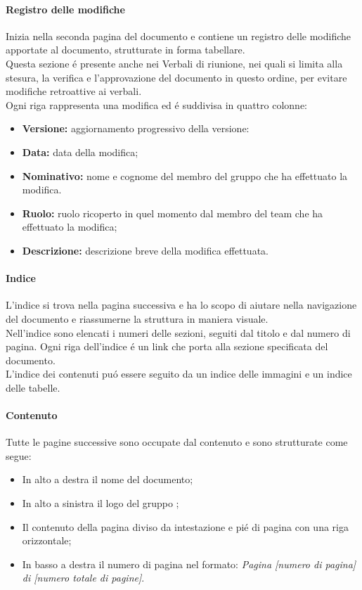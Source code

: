      \paragraph{Registro delle modifiche\\}
      Inizia nella seconda pagina del documento e contiene un registro delle modifiche apportate al documento, strutturate in forma tabellare.\\
      Questa sezione é presente anche nei Verbali di riunione, nei quali si limita alla stesura, la verifica e l'approvazione del documento in questo ordine, per evitare modifiche retroattive ai verbali.\\
      Ogni riga rappresenta una modifica ed é suddivisa in quattro colonne:
      \begin{itemize}
        \item \textbf{Versione:} aggiornamento progressivo della versione:
        \item \textbf{Data:} data della modifica;
        \item \textbf{Nominativo:} nome e cognome del membro del gruppo che ha effettuato la modifica.
        \item \textbf{Ruolo:} ruolo ricoperto in quel momento dal membro del team che ha effettuato la modifica;
        \item \textbf{Descrizione:} descrizione breve della modifica effettuata.
      \end{itemize}

      \paragraph{Indice\\}
      L'indice si trova nella pagina successiva e ha lo scopo di aiutare nella navigazione del documento e riassumerne la struttura in maniera visuale.\\
      Nell'indice sono elencati i numeri delle sezioni, seguiti dal titolo e dal numero di pagina. Ogni riga dell'indice é un link che porta alla sezione specificata del documento.\\
      L'indice dei contenuti puó essere seguito da un indice delle immagini e un indice delle tabelle.

      \paragraph{Contenuto\\}
      Tutte le pagine successive sono occupate dal contenuto e sono strutturate come segue:
      \begin{itemize}
        \item In alto a destra il nome del documento;
        \item In alto a sinistra il logo del gruppo \Gruppo{};
        \item Il contenuto della pagina diviso da intestazione e pié di pagina con una riga orizzontale;
        \item In basso a destra il numero di pagina nel formato: \textit{Pagina [numero di pagina] di [numero totale di pagine]}.
      \end{itemize}

